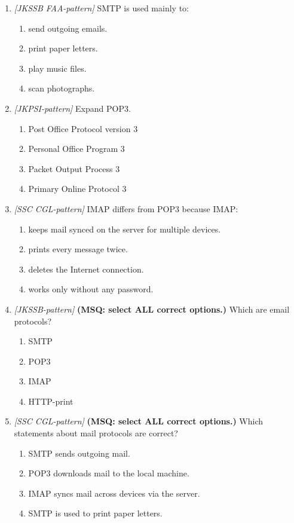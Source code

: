 \documentclass[11pt]{article}
\begin{document}
\begin{enumerate}[label=\textbf{Q\arabic*.}, leftmargin=*]
\item \textit{[JKSSB FAA-pattern]} SMTP is used mainly to:
  \begin{enumerate}[label=\Alph*.]
    \item send outgoing emails.
    \item print paper letters.
    \item play music files.
    \item scan photographs.
  \end{enumerate}
\item \textit{[JKPSI-pattern]} Expand POP3.
  \begin{enumerate}[label=\Alph*.]
    \item Post Office Protocol version 3
    \item Personal Office Program 3
    \item Packet Output Process 3
    \item Primary Online Protocol 3
  \end{enumerate}
\item \textit{[SSC CGL-pattern]} IMAP differs from POP3 because IMAP:
  \begin{enumerate}[label=\Alph*.]
    \item keeps mail synced on the server for multiple devices.
    \item prints every message twice.
    \item deletes the Internet connection.
    \item works only without any password.
  \end{enumerate}
\item \textit{[JKSSB-pattern]} \textbf{(MSQ: select ALL correct options.)} Which are email protocols?
  \begin{enumerate}[label=\Alph*.]
    \item SMTP
    \item POP3
    \item IMAP
    \item HTTP-print
  \end{enumerate}
\item \textit{[SSC CGL-pattern]} \textbf{(MSQ: select ALL correct options.)} Which statements about mail protocols are correct?
  \begin{enumerate}[label=\Alph*.]
    \item SMTP sends outgoing mail.
    \item POP3 downloads mail to the local machine.
    \item IMAP syncs mail across devices via the server.
    \item SMTP is used to print paper letters.
  \end{enumerate}
\end{enumerate}
\def\JKSSBLessonID{38}\def\JKSSBAnswers{0}
\end{document}
